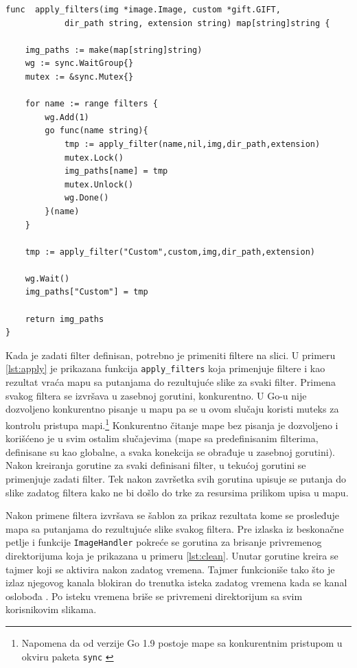 \documentclass[12pt,oneside]{memoir}
\begin{document}
\begin{center}
\begin{lstlisting}[caption=Funkcija za paralelnu primenu filtera,label={lst:apply},  backgroundcolor=\color{background}]
func  apply_filters(img *image.Image, custom *gift.GIFT, 
			dir_path string, extension string) map[string]string {

	img_paths := make(map[string]string)
	wg := sync.WaitGroup{}
	mutex := &sync.Mutex{}

	for name := range filters {
		wg.Add(1)
		go func(name string){
			tmp := apply_filter(name,nil,img,dir_path,extension)
			mutex.Lock()
			img_paths[name] = tmp
			mutex.Unlock()
			wg.Done()
		}(name)
	}

	tmp := apply_filter("Custom",custom,img,dir_path,extension)

	wg.Wait()
	img_paths["Custom"] = tmp

	return img_paths
}
\end{lstlisting}
\end{center}

Kada je zadati filter definisan, potrebno je primeniti filtere na slici. U primeru \ref{lst:apply} je prikazana funkcija  \texttt{apply\_filters} koja primenjuje filtere i kao rezultat vraća mapu sa putanjama do rezultujuće slike za svaki filter. Primena svakog filtera se izvršava u zasebnoj gorutini, konkurentno. U Go-u nije dozvoljeno konkurentno pisanje u mapu pa se u ovom slučaju koristi muteks za kontrolu pristupa mapi.\footnote{ Napomena da od verzije Go 1.9 postoje mape sa konkurentnim pristupom u okviru paketa \texttt{sync} \cite{sync}} Konkurentno čitanje mape bez pisanja je dozvoljeno i korišćeno je u svim ostalim slučajevima (mape sa predefinisanim filterima, definisane su kao globalne, a svaka konekcija se obrađuje u zasebnoj gorutini). Nakon kreiranja gorutine za svaki definisani filter, u tekućoj gorutini se primenjuje zadati filter. Tek nakon završetka svih gorutina upisuje se putanja do slike zadatog filtera kako ne bi došlo do trke za resursima prilikom upisa u mapu. 

Nakon primene filtera izvršava se šablon za prikaz rezultata kome se prosleđuje mapa sa putanjama do rezultujuće slike svakog filtera. Pre izlaska iz beskonačne petlje i funkcije  \texttt{ImageHandler} pokreće se gorutina za brisanje privremenog direktorijuma koja je prikazana u primeru \ref{lst:clean}. Unutar gorutine kreira se tajmer koji se aktivira nakon zadatog vremena. Tajmer funkcioniše tako što je izlaz njegovog kanala blokiran do trenutka isteka zadatog vremena kada se kanal oslobođa \cite{time}. Po isteku vremena briše se privremeni direktorijum sa svim korisnikovim slikama. 
\end{document}
